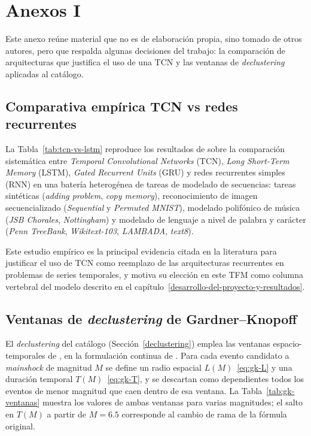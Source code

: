 \cleardoublepage

\chapter{Anexos I}
\label{anexos-i}

Este anexo reúne material que no es de elaboración propia, sino tomado de otros autores, pero que respalda algunas decisiones del trabajo: la comparación de arquitecturas que justifica el uso de una TCN y las ventanas de \textit{declustering} aplicadas al catálogo.

\section{Comparativa empírica TCN vs redes recurrentes}
\label{anexo-tcn-lstm}

La Tabla~\ref{tab:tcn-vs-lstm} reproduce los resultados de \citet{bai2018tcn} sobre la comparación sistemática entre \emph{Temporal Convolutional Networks} (TCN), \emph{Long Short-Term Memory} (LSTM), \emph{Gated Recurrent Units} (GRU) y redes recurrentes simples (RNN) en una batería heterogénea de tareas de modelado de secuencias: tareas sintéticas (\textit{adding problem}, \textit{copy memory}), reconocimiento de imagen secuencializado (\textit{Sequential} y \textit{Permuted MNIST}), modelado polifónico de música (\textit{JSB Chorales}, \textit{Nottingham}) y modelado de lenguaje a nivel de palabra y carácter (\textit{Penn TreeBank}, \textit{Wikitext-103}, \textit{LAMBADA}, \textit{text8}).



Este estudio empírico es la principal evidencia citada en la literatura para justificar el uso de TCN como reemplazo de las arquitecturas recurrentes en problemas de series temporales, y motiva su elección en este TFM como columna vertebral del modelo descrito en el capítulo~\ref{desarrollo-del-proyecto-y-resultados}.

\section{Ventanas de \textit{declustering} de Gardner--Knopoff}
\label{anexo-gardner-knopoff}

El \textit{declustering} del catálogo (Sección~\ref{declustering}) emplea las ventanas
espacio-temporales de \citet{gardner1974poissonian}, en la formulación continua de
\citet{vanstiphout2012declustering}. Para cada evento candidato a \textit{mainshock} de magnitud
\(M\) se define un radio espacial \(L(M)\)~\eqref{eq:gk-L} y una duración temporal \(T(M)\)~\eqref{eq:gk-T},
y se descartan como dependientes todos los eventos de menor magnitud que caen dentro de esa ventana.
La Tabla~\ref{tab:gk-ventanas} muestra los valores de ambas ventanas para varias magnitudes; el
salto en \(T(M)\) a partir de \(M = 6.5\) corresponde al cambio de rama de la fórmula original.

